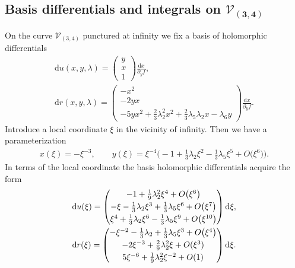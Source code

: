 \documentclass[pdftex]{sigma}
\numberwithin{equation}{section}
\newcommand{\rmd}{\mathrm{d}}
\begin{document}
\subsection[Basis differentials and integrals on $\mathcal{V}_{(3,4)}$]{Basis differentials and integrals on $\boldsymbol{\mathcal{V}_{(3,4)}}$}
On the curve $\mathcal{V}_{(3,4)}$ punctured at infinity we fix a basis of holomorphic differentials
\begin{subequations}\label{Diffs34}
\begin{gather}
\rmd u(x,y,\lambda) = \begin{pmatrix}
 y \\ x \\ 1
 \end{pmatrix} \frac{\rmd x}{\partial_y f},\label{Diff1s34} \\
 \rmd r(x,y,\lambda) = \begin{pmatrix}
 -x^2 \\ -2 y x \\ -5 y x^2 + \frac{2}{3} \lambda_2^2 x^2 + \frac{2}{3} \lambda_5 \lambda_2 x - \lambda_6 y
 \end{pmatrix}\frac{\rmd x}{\partial_y f}. \label{Diff2s34}
\end{gather}
\end{subequations}
Introduce a local coordinate $\xi$ in the vicinity of infinity. Then we have a parameterization
\begin{gather}\label{xyParamC34}
 x(\xi) = -\xi^{-3},\qquad y(\xi) = \xi^{-4}\big({-}1 + \tfrac{1}{3}\lambda_2 \xi^2 - \tfrac{1}{3} \lambda_5 \xi^5 + O\big(\xi^6\big)\big).
\end{gather}
In terms of the local coordinate the basis holomorphic differentials acquire the form
\begin{subequations}
 \begin{gather}\label{C34D1k}
 \rmd u(\xi) =
 \begin{pmatrix}
 -1 + \frac{1}{9} \lambda_2^2 \xi^4 + O\big(\xi^6\big)\vspace{1mm}\\
 -\xi - \frac{1}{3} \lambda_2 \xi^3 + \frac{1}{3} \lambda_5 \xi^6 + O\big(\xi^7\big)\vspace{1mm}\\
 \xi^4 + \frac{1}{3} \lambda_2 \xi^6 - \frac{1}{3} \lambda_5 \xi^{9} + O\big(\xi^{10}\big)
 \end{pmatrix} \rmd \xi,\\
\label{C34D2k}
 \rmd r(\xi) =
 \begin{pmatrix} -\xi^{-2} - \frac{1}{3} \lambda_2 + \frac{1}{3} \lambda_5\xi^3 + O\big(\xi^{4}\big) \vspace{1mm}\\
 - 2 \xi^{-3} + \frac{2}{9}\lambda_2^2 \xi + O(\xi^3)\vspace{1mm}\\
 5 \xi^{-6} + \frac{1}{9} \lambda_2^2 \xi^{-2} + O(1)\end{pmatrix} \rmd \xi.
\end{gather}
\end{subequations}
\end{document}
